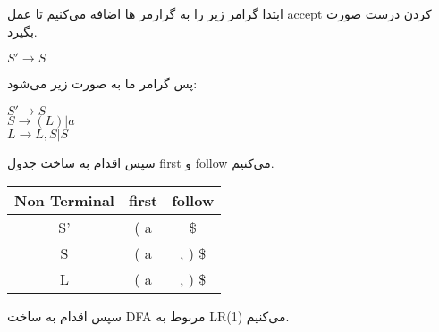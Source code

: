 

ابتدا گرامر زیر را به گرارمر ها اضافه می‌کنیم تا عمل accept کردن درست صورت بگیرد.

\begin{center}
\begin{latin}
$S' \rightarrow S$
\end{latin}
\end{center}

پس گرامر ما به صورت زیر می‌شود:

\begin{center}
\begin{latin}
$S' \rightarrow S$
\\
$S \rightarrow (L) | a$
\\
$L \rightarrow L,S | S$
\end{latin}
\end{center}

سپس اقدام به ساخت جدول first و follow می‌کنیم.

\begin{center}
    \begin{latin}
        \begin{tabular}{|c|c|c|}
            \hline
            Non Terminal & first & follow \\ \hline
            S'           & ( a   & \$     \\ \hline
            S            & ( a   & , ) \$  \\ \hline
            L            & ( a   & , ) \$  \\ \hline
        \end{tabular}
    \end{latin}
\end{center}

سپس اقدام به ساخت DFA مربوط به LR(1) می‌کنیم.



